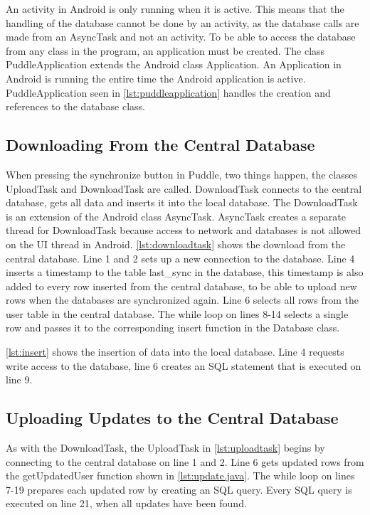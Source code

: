 An activity in Android is only running when it is active. This means that the handling of the database cannot be done by an activity, as the database calls are made from an AsyncTask and not an activity. To be able to access the database from any class in the program, an application must be created. The class PuddleApplication extends the Android class Application. An Application in Android is running the entire time the Android application is active. PuddleApplication seen in \autoref{lst:puddleapplication} handles the creation and references to the database class.



\subsection{Downloading From the Central Database}
When pressing the synchronize button in Puddle, two things happen, the classes UploadTask and DownloadTask are called. DownloadTask connects to the central database, gets all data and inserts it into the local database. The DownloadTask is an extension of the Android class AsyncTask. AsyncTask creates a separate thread for DownloadTask because access to network and databases is not allowed on the UI thread in Android.
\autoref{lst:downloadtask} shows the download from the central database. Line 1 and 2 sets up a new connection to the database. Line 4 inserts a timestamp to the table last\_sync in the database, this timestamp is also added to every row inserted from the central database, to be able to upload new rows when the databases are synchronized again. Line 6 selects all rows from the user table in the central database. The while loop on lines 8-14 selects a single row and passes it to the corresponding insert function in the Database class.



\autoref{lst:insert} shows the insertion of data into the local database. Line 4 requests write access to the database, line 6 creates an SQL statement that is executed on line 9.



\subsection{Uploading Updates to the Central Database}
As with the DownloadTask, the UploadTask in \autoref{lst:uploadtask} begins by connecting to the central database on line 1 and 2. Line 6 gets updated rows from the getUpdatedUser function shown in \autoref{lst:update.java}. The while loop on lines 7-19 prepares each updated row by creating an SQL query. Every SQL query is executed on line 21, when all updates have been found.

